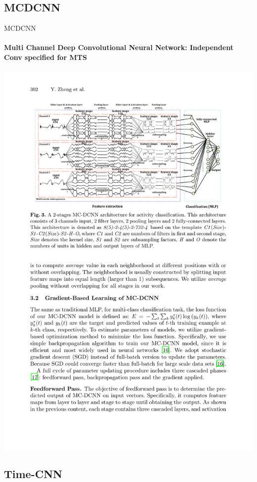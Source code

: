 \documentclass[aspectratio=169]{ctexbeamer}
\begin{document}
\subsection{MCDCNN}

\begin{frame}{MCDCNN}
	\framesubtitle{Multi Channel Deep Convolutional Neural Network: \textbf{Independent} Conv specified for \textbf{MTS}}
	\begin{center}
		\includegraphics[width=.75\textwidth]{figure/mcdcnn}
	\end{center}
\end{frame}

\subsection{Time-CNN}
\end{document}
